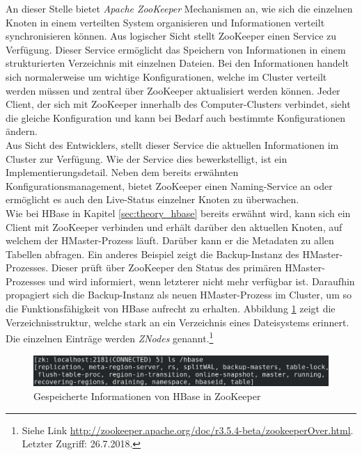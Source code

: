 \noindent
An dieser Stelle bietet \textit{Apache ZooKeeper\texttrademark\thinspace} Mechanismen an, wie sich die einzelnen Knoten in einem verteilten System organisieren und Informationen verteilt synchronisieren können. Aus logischer Sicht stellt ZooKeeper einen Service zu Verfügung. 
Dieser Service ermöglicht das Speichern von Informationen in einem strukturierten Verzeichnis mit einzelnen Dateien. Bei den Informationen handelt sich normalerweise um wichtige Konfigurationen, welche im Cluster verteilt werden müssen und zentral über ZooKeeper aktualisiert werden können. Jeder Client, der sich mit ZooKeeper innerhalb des Computer-Clusters verbindet, sieht die gleiche Konfiguration und kann bei Bedarf auch bestimmte Konfigurationen ändern.\cite[S. 4-5]{professional_hadoop} \\
Aus Sicht des Entwicklers, stellt dieser Service die aktuellen Informationen im Cluster zur Verfügung. Wie der Service dies bewerkstelligt, ist ein Implementierungsdetail. 
Neben dem bereits erwähnten Konfigurationsmanagement, bietet ZooKeeper einen Naming-Service an oder ermöglicht es auch den Live-Status einzelner Knoten zu überwachen.\cite{zookeeper_essentials}\\

\noindent
Wie bei HBase in Kapitel \ref{sec:theory_hbase} bereits erwähnt wird, kann sich ein Client mit ZooKeeper verbinden und erhält darüber den aktuellen Knoten, auf welchem der HMaster-Prozess läuft. Darüber kann er die Metadaten zu allen Tabellen abfragen. Ein anderes Beispiel zeigt die Backup-Instanz des HMaster-Prozesses.
Dieser prüft über ZooKeeper den Status des primären HMaster-Prozesses und wird informiert, wenn letzterer nicht mehr verfügbar ist. Daraufhin propagiert sich die Backup-Instanz als neuen HMaster-Prozess im Cluster, um so die Funktionsfähigkeit von HBase aufrecht zu erhalten. Abbildung \ref{fig:zookeeper_dir} zeigt die Verzeichnisstruktur, welche stark an ein Verzeichnis eines Dateisystems erinnert. Die einzelnen Einträge werden \textit{ZNodes} genannt.\footnote{Siehe Link \url{http://zookeeper.apache.org/doc/r3.5.4-beta/zookeeperOver.html}. Letzter Zugriff: 26.7.2018.} \\

\begin{figure}[ht]
  \centering
  \includegraphics[width=\textwidth]{./resource/zookeeper_dir.png}
  \caption{Gespeicherte Informationen von HBase in ZooKeeper}
  \label{fig:zookeeper_dir}
\end{figure}


